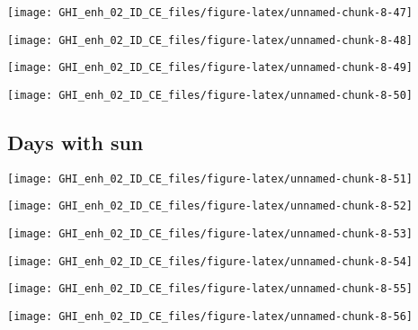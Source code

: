 \documentclass[
  10pt,
  a4paper,oneside]{article}
\begin{document}
\begin{center}\texttt{[image: GHI\_enh\_02\_ID\_CE\_files/figure-latex/unnamed-chunk-8-47]} \end{center}

\begin{center}\texttt{[image: GHI\_enh\_02\_ID\_CE\_files/figure-latex/unnamed-chunk-8-48]} \end{center}

\begin{center}\texttt{[image: GHI\_enh\_02\_ID\_CE\_files/figure-latex/unnamed-chunk-8-49]} \end{center}

\begin{center}\texttt{[image: GHI\_enh\_02\_ID\_CE\_files/figure-latex/unnamed-chunk-8-50]} \end{center}

\FloatBarrier

\hypertarget{days-with-sun}{%
\subsection{Days with sun}\label{days-with-sun}}

\begin{center}\texttt{[image: GHI\_enh\_02\_ID\_CE\_files/figure-latex/unnamed-chunk-8-51]} \end{center}

\begin{center}\texttt{[image: GHI\_enh\_02\_ID\_CE\_files/figure-latex/unnamed-chunk-8-52]} \end{center}

\begin{center}\texttt{[image: GHI\_enh\_02\_ID\_CE\_files/figure-latex/unnamed-chunk-8-53]} \end{center}

\begin{center}\texttt{[image: GHI\_enh\_02\_ID\_CE\_files/figure-latex/unnamed-chunk-8-54]} \end{center}

\begin{center}\texttt{[image: GHI\_enh\_02\_ID\_CE\_files/figure-latex/unnamed-chunk-8-55]} \end{center}

\begin{center}\texttt{[image: GHI\_enh\_02\_ID\_CE\_files/figure-latex/unnamed-chunk-8-56]} \end{center}
\end{document}
